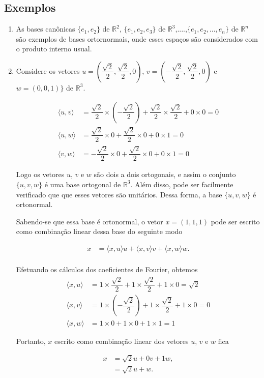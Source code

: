 \subsection{Exemplos}
\begin{enumerate}
\item As bases canônicas  $\{ e_1, e_2\}$ de $\mathbb{R}^2$, $\{ e_1, e_2, e_3\}$ de $\mathbb{R}^3$,....,$\{ e_1, e_2, ..., e_n\}$  de  $\mathbb{R}^n$ são exemplos de bases ortornormais, onde esses espaços são considerados com o produto interno usual.

\item  Considere os vetores $u=(\dfrac{\sqrt{2}}{2},\dfrac{\sqrt{2}}{2}, 0)$, $v= (-\dfrac{\sqrt{2}}{2},\dfrac{\sqrt{2}}{2}, 0)$ e $w= (0, 0, 1)\}$  de $\mathbb{R}^3$.

\begin{align*}
\langle u, v \rangle &= \dfrac{\sqrt{2}}{2}\times (-\dfrac{\sqrt{2}}{2}) +\dfrac{\sqrt{2}}{2} \times\dfrac{\sqrt{2}}{2}+0 \times 0=0 \\
\langle u, w \rangle &=  \dfrac{\sqrt{2}}{2}\times 0 +\dfrac{\sqrt{2}}{2} \times 0+0 \times 1=0 \\
\langle v , w\rangle &= -\dfrac{\sqrt{2}}{2}\times 0 +\dfrac{\sqrt{2}}{2} \times 0+0 \times 1=0
\end{align*}

Logo os vetores $u$, $v$ e $w$ são  dois a dois ortogonais,  e assim  o conjunto $\{ u, v, w\}$ é uma base ortogonal de $\mathbb{R}^3$. Além disso, pode ser facilmente verificado que que esses vetores são unitários. Dessa forma, a  base  $\{ u, v, w\}$ é ortonormal.


Sabendo-se que essa base é ortonormal, o vetor $x= (1, 1, 1)$ pode ser escrito como combinação linear dessa base do seguinte modo

\begin{align*}
x &= \langle x, u \rangle u + \langle x, v \rangle v+ \langle x, w \rangle w. \\
\end{align*}

Efetuando os cálculos dos coeficientes de Fourier, obtemos
\begin{align*}
\langle x, u\rangle &= 1\times \dfrac{\sqrt{2}}{2} +1 \times \dfrac{\sqrt{2}}{2} + 1 \times 0= \sqrt{2} \\
\langle x, v \rangle &= 1 \times (- \dfrac{\sqrt{2}}{2}) +1 \times \dfrac{\sqrt{2}}{2}+ 1 \times 0=0 \\
\langle x , w\rangle &= 1\times 0 +1 \times 0+1 \times 1=1
\end{align*}

Portanto, $x$ escrito como combinação linear dos vetores $u$, $v$ e $w$ fica

\begin{align*}
x &= \sqrt{2} u + 0 v+ 1w,\\
  & =\sqrt{2} u +w.
\end{align*}


\end{enumerate}

